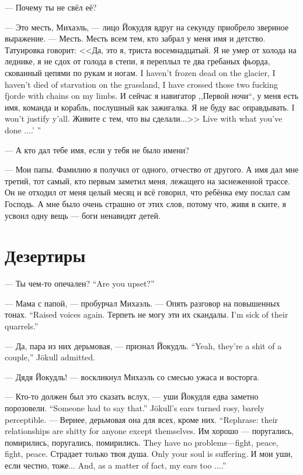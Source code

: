 --- Почему ты не свёл её?

--- Это месть, Михаэль, --- лицо Йокудля вдруг на секунду приобрело звериное выражение.
--- Месть.
Месть всем тем, кто забрал у меня имя и детство.
Татуировка говорит: <<Да, это я, триста восемнадцатый.
{Я не умер от холода на леднике, я не сдох от голода в степи, я переплыл те два гребаных фьорда, скованный цепями по рукам и ногам.}
{I haven't frozen dead on the glacier, I haven't died of starvation on the grassland, I have crossed those two fucking fjorde with chains on my limbs.}
И сейчас я навигатор ,,Первой ночи``, у меня есть имя, команда и корабль, послушный как зажигалка.
{Я не буду вас оправдывать.}
{I won't justify y'all.}
{Живите с тем, что вы сделали...>>}
{Live with what you've done ....' ''}

--- А кто дал тебе имя, если у тебя не было имени?

--- Мои папы.
Фамилию я получил от одного, отчество от другого.
А имя дал мне третий, тот самый, кто первым заметил меня, лежащего на заснеженной трассе.
Он не отходил от меня целый месяц и всё говорил, что ребёнка ему послал сам Господь.
А мне было очень страшно от этих слов, потому что, живя в ските, я усвоил одну вещь --- боги ненавидят детей.

\section{Дезертиры}

{--- Ты чем-то опечален?}
{``Are you upset?''}

--- Мама с папой, --- пробурчал Михаэль.
{--- Опять разговор на повышенных тонах.}
{``Raised voices again.}
{Терпеть не могу эти их скандалы.}
{I'm sick of their quarrels.''}

{--- Да, пара из них дерьмовая, --- признал Йокудль.}
{``Yeah, they're a shit of a couple,'' Jökull admitted.}

--- Дядя Йокудль! --- воскликнул Михаэль со смесью ужаса и восторга.

{--- Кто-то должен был это сказать вслух, --- уши Йокудля едва заметно порозовели.}
{``Someone had to say that.'' Jökull's ears turned rosy, barely perceptible.}
{--- Вернее, дерьмовая она для всех, кроме них.}
{``Rephrase: their relationships are shitty for anyone except themselves.}
{Им хорошо --- поругались, помирились, поругались, помирились.}
{They have no problems---fight, peace, fight, peace.}
{Страдает только твоя душа.}
{Only your soul is suffering.}
{И мои уши, если честно, тоже...}
{And, as a matter of fact, my ears too ....''}

